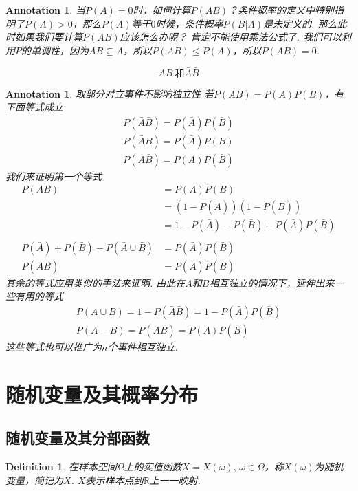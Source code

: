 \documentclass{article}
\newtheorem{definition}[theorem]{Definition}
\newtheorem{annotation}[theorem]{Annotation}
\begin{document}
\begin{annotation}
\rm {\color{red} 当$P(A) = 0$时，如何计算$P(AB)$？}条件概率的定义中特别指明了$P(A) > 0$，那么$P(A)$等于$0$时候，条件概率$P(B|A)$是未定义的. 那么此时如果我们要计算$P(AB)$应该怎么办呢？ 肯定不能使用乘法公式了. 我们可以利用$P$的{\color{blue}单调性}，因为$AB \subseteq A$，所以$P(AB) \leq P(A)$，所以$P(AB)=0$.
\end{annotation}

$$
AB ~\text{和} \bar{A} \bar{B}
$$

\begin{annotation}
\rm {\color{red} 取部分对立事件不影响独立性} 若$P(AB) = P(A)P(B)$，有下面等式成立
$$
\begin{array}{l}
P(\bar{A}\bar{B}) = P(\bar{A})P(\bar{B})\\
P(\bar{A}B) = P(\bar{A})P(B)\\
P(A\bar{B}) = P(A)P(\bar{B})
\end{array}
$$
我们来证明第一个等式
$$
\begin{array}{rl}
P(AB) &= P(A)P(B) \\
	  &= (1-P(\bar{A}))(1-P(\bar{B}))\\
	  &= 1-P(\bar{A})-P(\bar{B}) + P(\bar{A})P(\bar{B})\\
	  \\
P(\bar{A}) + P(\bar{B}) - P(\bar{A} \cup \bar{B}) &= P(\bar{A})P(\bar{B}) \\
P(\bar{A}\bar{B}) &= P(\bar{A})P(\bar{B})
\end{array}
$$
其余的等式应用类似的手法来证明. 由此在$A$和$B$相互独立的情况下，延伸出来一些有用的等式
$$
\begin{array}{l}
P(A \cup B) = 1 - P(\bar{A}\bar{B}) = 1-P(\bar{A})P(\bar{B})\\
P(A-B) = P(A\bar{B}) = P(A)P(\bar{B}) 
\end{array}
$$
这些等式也可以推广为$n$个事件相互独立.
\end{annotation}


\section{随机变量及其概率分布}

\subsection{随机变量及其分部函数}

\begin{definition}
\rm 在样本空间$\Omega$上的实值函数$X=X(\omega),\, \omega \in \Omega$，称$X(\omega)$为{\color{red}随机变量}，简记为$X$. $X$表示样本点到$\mathbb{R}$上一一映射.  
\end{definition}
\end{document}
